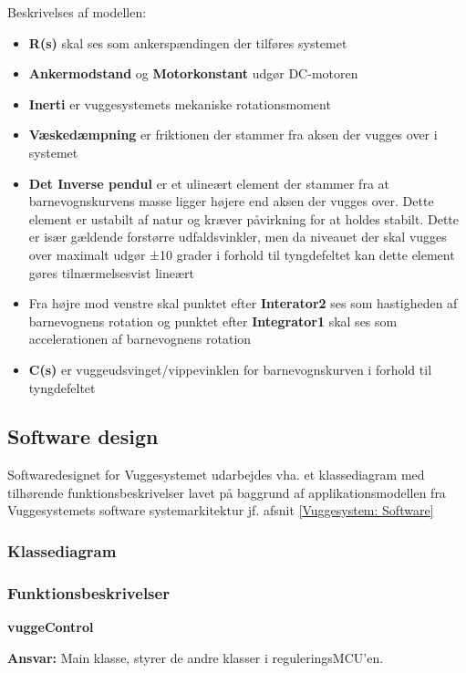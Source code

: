 Beskrivelses af modellen:
\begin{itemize}
\item \textbf{R(s)} skal ses som ankerspændingen der tilføres systemet
\item \textbf{Ankermodstand} og \textbf{Motorkonstant} udgør DC-motoren
\item \textbf{Inerti} er vuggesystemets mekaniske rotationsmoment
\item \textbf{Væskedæmpning} er friktionen der stammer fra aksen der vugges over i systemet
\item \textbf{Det Inverse pendul} er et ulineært element der stammer fra at barnevognskurvens masse ligger højere end aksen der vugges over. Dette element er ustabilt af natur og kræver påvirkning for at holdes stabilt. Dette er især gældende forstørre udfaldsvinkler, men da niveauet der skal vugges over maximalt udgør ±10 grader i forhold til tyngdefeltet kan dette element gøres tilnærmelsesvist lineært
\item Fra højre mod venstre skal punktet efter \textbf{Interator2} ses som hastigheden af barnevognens rotation og punktet efter \textbf{Integrator1} skal ses som accelerationen af barnevognens rotation
\item \textbf{C(s)} er vuggeudsvinget/vippevinklen for barnevognskurven i forhold til tyngdefeltet

\end{itemize}

\newpage
\subsection{Software design}
Softwaredesignet for Vuggesystemet udarbejdes vha. et klassediagram med tilhørende funktionsbeskrivelser lavet på baggrund af applikationsmodellen fra Vuggesystemets software systemarkitektur jf. afsnit \ref{Vuggesystem: Software}

\subsubsection*{Klassediagram}

\subsubsection*{Funktionsbeskrivelser}
{\centering
\textbf{vuggeControl}\par
}
\textbf{Ansvar:} Main klasse, styrer de andre klasser i reguleringsMCU'en. \


